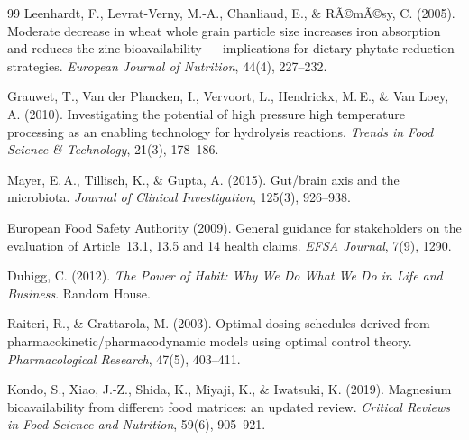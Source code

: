 ﻿\documentclass[12pt,a4paper]{article}
\theoremstyle{plain}
\theoremstyle{definition}
\theoremstyle{remark}
\begin{document}
\begin{thebibliography}{99}
Leenhardt, F., Levrat-Verny, M.-A., Chanliaud, E., \& RÃ©mÃ©sy, C. (2005).
Moderate decrease in wheat whole grain particle size increases iron
absorption and reduces the zinc bioavailability --- implications for
dietary phytate reduction strategies.
\textit{European Journal of Nutrition}, 44(4), 227--232.

Grauwet, T., Van der Plancken, I., Vervoort, L., Hendrickx, M.\,E., \&
Van Loey, A. (2010).
Investigating the potential of high pressure high temperature processing
as an enabling technology for hydrolysis reactions.
\textit{Trends in Food Science \& Technology}, 21(3), 178--186.

Mayer, E.\,A., Tillisch, K., \& Gupta, A. (2015).
Gut/brain axis and the microbiota.
\textit{Journal of Clinical Investigation}, 125(3), 926--938.

European Food Safety Authority (2009).
General guidance for stakeholders on the evaluation of Article~13.1,
13.5 and 14 health claims.
\textit{EFSA Journal}, 7(9), 1290.

Duhigg, C. (2012).
\textit{The Power of Habit: Why We Do What We Do in Life and Business}.
Random House.

Raiteri, R., \& Grattarola, M. (2003).
Optimal dosing schedules derived from pharmacokinetic/pharmacodynamic
models using optimal control theory.
\textit{Pharmacological Research}, 47(5), 403--411.

Kondo, S., Xiao, J.-Z., Shida, K., Miyaji, K., \& Iwatsuki, K. (2019).
Magnesium bioavailability from different food matrices: an updated
review.
\textit{Critical Reviews in Food Science and Nutrition}, 59(6),
905--921.

\end{thebibliography}
\end{document}
